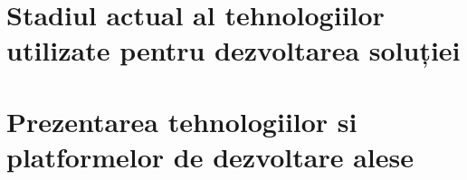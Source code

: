 \section {Stadiul actual al tehnologiilor utilizate pentru dezvoltarea soluției}


\section {Prezentarea tehnologiilor si platformelor de dezvoltare alese}